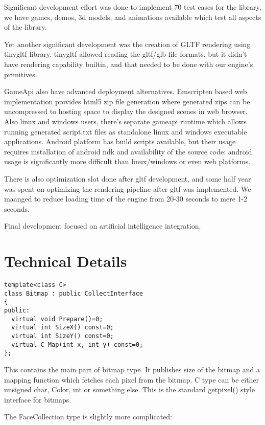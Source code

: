 \documentclass[11pt,twoside,a4paper]{article}
\begin{document}
Significant development effort was done to implement 70 test cases for
the library, we have games, demos, 3d models, and animations available
which test all aspects of the library.

Yet another significant development was the creation of GLTF rendering
using tinygltf library. tinygltf allowed reading the gltf/glb file
formats, but it didn't have rendering capability builtin, and that
needed to be done with our engine's primitives.

GameApi also have advanced deployment alternatives. Emscripten based
web implementation provides html5 zip file generation where generated
zips can be uncompressed to hosting space to display the designed
scenes in web browser. Also linux and windows users, there's separate
gameapi runtime which allows running generated script.txt files as
standalone linux and windows executable applications. Android platform
has build scripts available, but their usage requires installation of
android ndk and availability of the source code: android usage is
significantly more difficult than linux/windows or even web platforms.

There is also optimization slot done after gltf development, and some
half year was spent on optimizing the rendering pipeline after gltf
was implemented. We maanged to reduce loading time of the engine from
20-30 seconds to mere 1-2 seconds.

Final development focused on artificial intelligence integration.

\section{Technical Details}

\begin{verbatim}
template<class C>
class Bitmap : public CollectInterface
{
public:
  virtual void Prepare()=0;
  virtual int SizeX() const=0;
  virtual int SizeY() const=0;
  virtual C Map(int x, int y) const=0;
};
\end{verbatim}

This contains the main part of bitmap type. It publishes size of the bitmap and a mapping function which fetches each pixel from the bitmap. C type can be either unsigned char, Color, int or something else. This is the standard getpixel() style interface for bitmaps.

The FaceCollection type is slightly more complicated:
\end{document}
